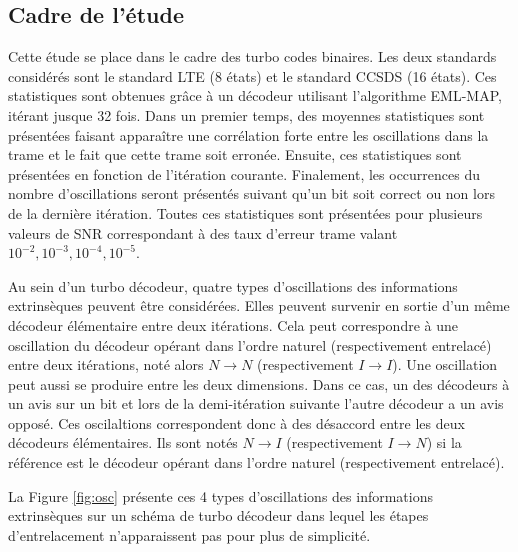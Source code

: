\subsection{Cadre de l'étude}
Cette étude se place dans le cadre des turbo codes binaires. Les deux standards considérés sont le standard LTE (8 
états) et le standard CCSDS (16 états). Ces statistiques sont obtenues grâce à un décodeur utilisant l'algorithme 
EML-MAP, itérant jusque 32 fois. Dans un premier temps, des moyennes statistiques sont présentées faisant apparaître une 
corrélation forte entre les oscillations dans la trame et le fait que cette trame soit erronée. Ensuite, ces 
statistiques sont présentées en fonction de l'itération courante. Finalement, les occurrences du nombre d'oscillations
seront présentés suivant qu'un bit soit correct ou non lors de la dernière itération. Toutes ces statistiques sont 
présentées pour plusieurs valeurs de SNR correspondant à des taux d'erreur trame valant $10^{-2}, 10^{-3}, 10^{-4}, 
10^{-5}$.

Au sein d'un turbo décodeur, quatre types d'oscillations des informations extrinsèques peuvent être considérées. Elles 
peuvent survenir en sortie d'un même décodeur élémentaire entre deux itérations. Cela peut correspondre à une 
oscillation du décodeur opérant dans l'ordre naturel (respectivement entrelacé) entre deux itérations, noté alors 
$N\rightarrow N$ (respectivement $I\rightarrow I$). Une oscillation peut aussi se produire entre les deux dimensions. 
Dans ce cas, un des décodeurs à un avis sur un bit et lors de la demi-itération suivante l'autre décodeur a un avis 
opposé. Ces oscilaltions correspondent donc à des désaccord entre les deux décodeurs élémentaires. Ils sont notés 
$N\rightarrow I$ (respectivement $I\rightarrow N$) si la référence est le décodeur opérant dans l'ordre naturel 
(respectivement entrelacé).

La Figure \ref{fig:osc} présente ces 4 types d’oscillations des informations extrinsèques sur un schéma de turbo 
décodeur dans lequel les étapes d'entrelacement n’apparaissent pas pour plus de simplicité.

